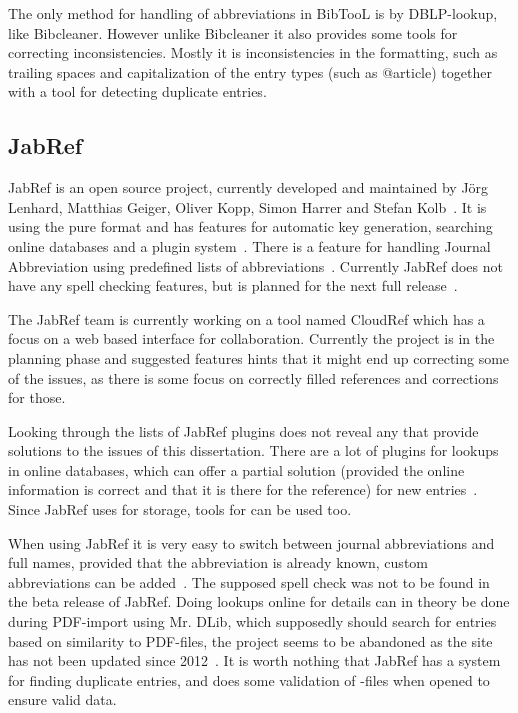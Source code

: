 The only method for handling of abbreviations in BibTooL is by
DBLP-lookup, like Bibcleaner.  However unlike Bibcleaner it also
provides some tools for correcting inconsistencies.  Mostly it is
inconsistencies in the formatting, such as trailing spaces and
capitalization of the entry types (such as @article) together with a
tool for detecting duplicate entries.

\subsection{JabRef}
JabRef is an open source project, currently developed and maintained
by Jörg Lenhard, Matthias Geiger, Oliver Kopp, Simon Harrer and Stefan
Kolb~\cite{jabref_developers}.  It is using the pure {\bibtex} format
and has features for automatic key generation, searching online
databases and a plugin system~\cite{jabref_features}.  There is a
feature for handling Journal Abbreviation using predefined lists of
abbreviations~\cite{jabref_abbreviations}.  Currently JabRef does not
have any spell checking features, but is planned for the next full
release~\cite{jabref_spellchecker}.

The JabRef team is currently working on a tool named CloudRef which
has a focus on a web based interface for collaboration.  Currently the
project is in the planning phase and suggested features hints that it
might end up correcting some of the issues, as there is some focus on
correctly filled {\bibtex} references and corrections for those.

Looking through the lists of JabRef plugins does not reveal any that
provide solutions to the issues of this dissertation.  There are a lot
of plugins for lookups in online databases, which can offer a partial
solution (provided the online information is correct and that it is
there for the reference) for new entries~\cite{jabref_resources}.
Since JabRef uses {\bibtex} for storage, tools for {\bibtex} can be
used too.

When using JabRef it is very easy to switch between journal
abbreviations and full names, provided that the abbreviation is
already known, custom abbreviations can be
added~\cite{jabref_abbreviations}.  The supposed spell check was not to
be found in the beta release of JabRef.  Doing lookups online for
details can in theory be done during PDF-import using Mr. DLib, which
supposedly should search for entries based on similarity to PDF-files,
the project seems to be abandoned as the site has not been updated
since 2012~\cite{jabref_mrdlib,jabref_mrdlib_notice}.  It is worth
nothing that JabRef has a system for finding duplicate entries, and
does some validation of {\bibtex}-files when opened to ensure valid
data.

